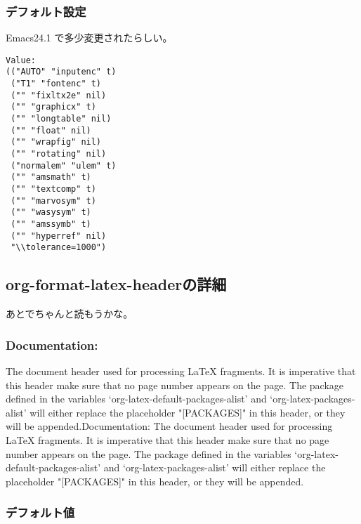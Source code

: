 \documentclass[dvipdfmx,12pt]{jsarticle}
\begin{document}
\subsubsection{デフォルト設定}
\label{sec-3-4-2}

Emacs24.1 で多少変更されたらしい。

\lstset{language=Lisp,label= ,caption= ,numbers=none}
\begin{lstlisting}
Value:
(("AUTO" "inputenc" t)
 ("T1" "fontenc" t)
 ("" "fixltx2e" nil)
 ("" "graphicx" t)
 ("" "longtable" nil)
 ("" "float" nil)
 ("" "wrapfig" nil)
 ("" "rotating" nil)
 ("normalem" "ulem" t)
 ("" "amsmath" t)
 ("" "textcomp" t)
 ("" "marvosym" t)
 ("" "wasysym" t)
 ("" "amssymb" t)
 ("" "hyperref" nil)
 "\\tolerance=1000")
\end{lstlisting}


\subsection{org-format-latex-headerの詳細}
\label{sec-3-5}

あとでちゃんと読もうかな。

\subsubsection{Documentation:}
\label{sec-3-5-1}
The document header used for processing \LaTeX{} fragments.  It is
imperative that this header make sure that no page number appears
on the page.  The package defined in the variables
`org-latex-default-packages-alist' and `org-latex-packages-alist'
will either replace the placeholder "[PACKAGES]" in this header,
or they will be appended.Documentation: The document header used
for processing \LaTeX{} fragments.  It is imperative that this header
make sure that no page number appears on the page.  The package
defined in the variables `org-latex-default-packages-alist' and
`org-latex-packages-alist' will either replace the placeholder
"[PACKAGES]" in this header, or they will be appended.

\subsubsection{デフォルト値}
\label{sec-3-5-2}
\end{document}
